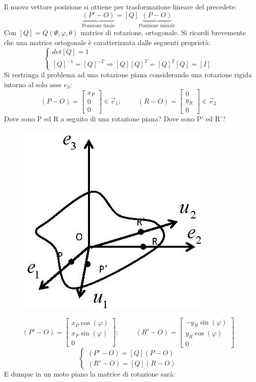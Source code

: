 \documentclass{article}
\begin{document}
\begin{adjustwidth}{2in}{}
Il nuovo vettore posizione si ottiene per trasformazione lineare del precedete: 
\[ \underbrace{(P'-O)}_\text{Posizione finale} = [Q]\underbrace{(P-O)}_\text{Posizione iniziale}\]
Con $ [Q]=Q(\Psi, \varphi, \theta)$ matrice di rotazione, ortogonale. \newline
Si ricordi brevemente che una matrice ortogonale è caratterizzata dalle seguenti proprietà: 
\[ \begin{cases}
	det[Q] = 1\\
	[Q]^{-1} = [Q]^{-T} \Rightarrow [Q][Q]^{T} = [Q]^{T}[Q]=[I]
\end{cases}
\]
Si restringa il problema ad una rotazione piana considerando una rotazione rigida intorno al solo asse $e_{3}$:
\[ 
(P-O)=\left[\begin{array}{c}
	x_{P} \\
	0 \\
	0
\end{array}\right] \in \vec{e}_1; \hspace{1cm} 
(R-O)=\left[\begin{array}{c}
	0 \\
	y_{R} \\
	0
\end{array}\right] \in \vec{e}_2
\]
Dove sono P ed R a seguito di una rotazione piana? Dove sono P' ed R'?
\begin{figure}[H]
	\centering
	\includegraphics[width=0.25\linewidth]{"immagini/1.PARTE1_Pagina_21"}
\end{figure}
\[ 
(P'-O) = \left[\begin{array}{c}
	x_{P}\cos(\varphi) \\
	x_{P}\sin(\varphi) \\
	0
\end{array}\right]; \hspace{1cm} 
(R'-O) = \left[\begin{array}{c}
	-y_{R}\sin(\varphi) \\
	y_{R}\cos(\varphi) \\
	0
\end{array}\right] 
\]
\[
\begin{cases}
	(P'-O) = [Q](P-O)\\
	(R'-O) = [Q](R-O)
\end{cases}
\]
\newpage
E dunque in un moto piano la matrice di rotazione sarà: 


\end{adjustwidth}
\end{document}
